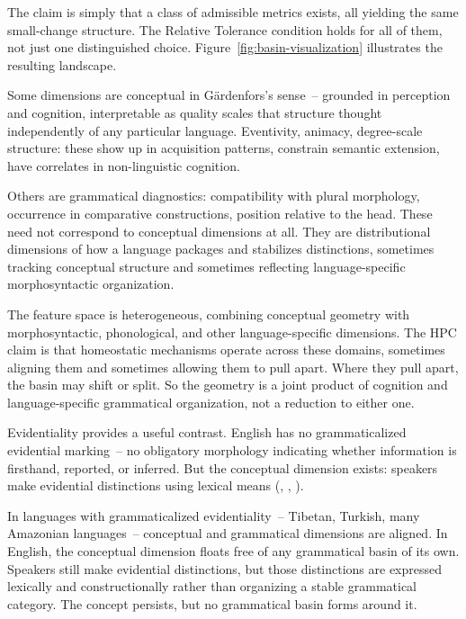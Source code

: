 The claim is simply that a class of admissible metrics exists, all yielding the same small-change structure. The Relative Tolerance condition holds for all of them, not just one distinguished choice. Figure~\ref{fig:basin-visualization} illustrates the resulting landscape.

Some dimensions are conceptual in Gärdenfors's sense~-- grounded in perception and cognition, interpretable as quality scales that structure thought independently of any particular language. Eventivity, animacy, degree-scale structure: these show up in acquisition patterns, constrain semantic extension, have correlates in non-linguistic cognition.

Others are grammatical diagnostics: compatibility with plural morphology, occurrence in comparative constructions, position relative to the head. These need not correspond to conceptual dimensions at all. They are distributional dimensions of how a language packages and stabilizes distinctions, sometimes tracking conceptual structure and sometimes reflecting language-specific morphosyntactic organization.

The feature space is heterogeneous, combining conceptual geometry with morphosyntactic, phonological, and other language-specific dimensions. The HPC claim is that homeostatic mechanisms operate across these domains, sometimes aligning them and sometimes allowing them to pull apart. Where they pull apart, the basin may shift or split. So the geometry is a joint product of cognition and language-specific grammatical organization, not a reduction to either one.

Evidentiality provides a useful contrast. English has no grammaticalized evidential marking~-- no obligatory morphology indicating whether information is firsthand, reported, or inferred. But the conceptual dimension exists: speakers make evidential distinctions using lexical means (, , ).

In languages with grammaticalized evidentiality~-- Tibetan, Turkish, many Amazonian languages~-- conceptual and grammatical dimensions are aligned. In English, the conceptual dimension floats free of any grammatical basin of its own. Speakers still make evidential distinctions, but those distinctions are expressed lexically and constructionally rather than organizing a stable grammatical category. The concept persists, but no grammatical basin forms around it.

